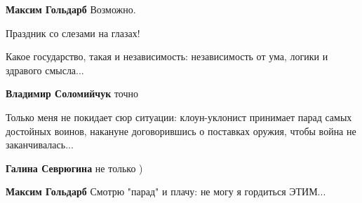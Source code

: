 \begin{itemize}
\begin{itemize}
\textbf{Максим Гольдарб} Возможно.
\end{itemize}

 
Праздник со слезами на глазах!


Какое государство, такая и независимость: независимость от ума, логики и здравого смысла...

\begin{itemize}
 
\textbf{Владимир Соломийчук} точно
\end{itemize}


Только меня не покидает сюр ситуации: клоун-уклонист принимает парад самых
достойных воинов, накануне договорившись о поставках оружия, чтобы война не
заканчивалась...

\begin{itemize}
 
\textbf{Галина Севрюгина} не только )

 
\textbf{Максим Гольдарб} Смотрю "парад" и плачу: не могу я гордиться ЭТИМ...

 

\end{itemize}
\end{itemize}
